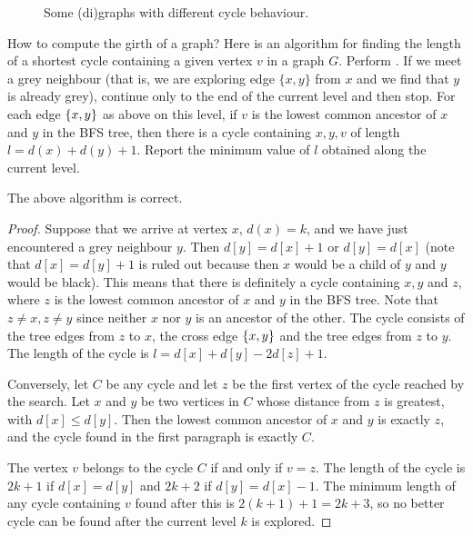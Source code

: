 \begin{figure}

\caption{Some (di)graphs with different cycle behaviour.}
\label{fig:cycle}
\end{figure}

How to compute the girth of a graph? Here is an algorithm for finding
the length of a shortest cycle containing a given vertex $v$ in a graph
$G$. Perform . If we meet a grey neighbour (that is,
we are exploring edge $\{x, y\}$ from $x$ and we find that $y$ is already
grey), continue only to the end of the current level and then stop. For
each edge $\mbox{$\{x, y\}$}$ as above on this level, if $v$ is the lowest
common ancestor of $x$ and $y$ in the BFS tree, then there is a cycle
containing $x, y, v$ of length $l=d(x) + d(y) + 1$. Report the minimum
value of $l$ obtained along the current level.

\begin{Theorem}
\label{thm:BFS-cycle} 
The above algorithm is correct.
\end{Theorem}

\begin{proof}
Suppose that we arrive at vertex $x$, $d(x) = k$, and we have just
encountered a grey neighbour $y$. Then $d[y] = d[x] + 1$ or $d[y] = d[x]$
(note that $d[x] = d[y] + 1$ is ruled out because then $x$ would be a
child of $y$ and $y$ would be black). This means that there is definitely
a cycle containing $x, y$ and $z$, where $z$ is the lowest common ancestor
of $x$ and $y$ in the BFS tree. Note that $z\neq x, z\neq y$ since neither
$x$ nor $y$ is an ancestor of the other. The cycle consists of the tree
edges from $z$ to $x$, the cross edge $\mbox{$\{x,y\}$}$ and the tree edges
from $z$ to $y$. The length of the cycle is $l=d[x] + d[y] - 2 d[z] + 1$.

Conversely, let $C$ be any cycle and let $z$ be the first vertex of
the cycle reached by the search. Let $x$ and $y$ be two vertices in $C$
whose distance  from $z$ is greatest, with $d[x] \leq d[y]$. Then the
lowest common ancestor of  $x$ and $y$ is exactly $z$, and the cycle
found in the first paragraph is exactly $C$.

The vertex $v$ belongs to the cycle $C$ if and only if $v = z$. The
length of the cycle is $2k+1$ if $d[x] = d[y]$ and $2k+2$ if $d[y] =
d[x] - 1$. The minimum length of any cycle containing $v$ found after
this is $2(k+1) + 1 = 2k+3$, so no better cycle can be found after the
current level $k$ is explored.
\end{proof}

